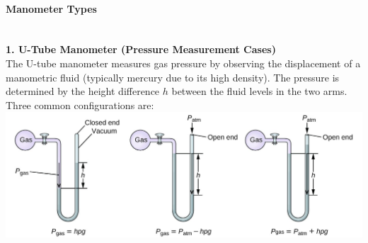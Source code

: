 \documentclass{article}
\begin{document}
\paragraph{Manometer Types}\mbox{}\\[1em]
\small\textbf{1. U-Tube Manometer (Pressure Measurement Cases)}\\[8pt] \large
\noindent The U-tube manometer measures gas pressure by observing the displacement of a manometric fluid (typically mercury due to its high density). The pressure is determined by the height difference $h$ between the fluid levels in the two arms. Three common configurations are:\\[3pt]
\includegraphics[width=1\textwidth]{images/CNX_Chem_09_01_Manometer1.jpg}
\label{fig:cnxchem0901manometer1}
\vspace{1em}
\end{document}
